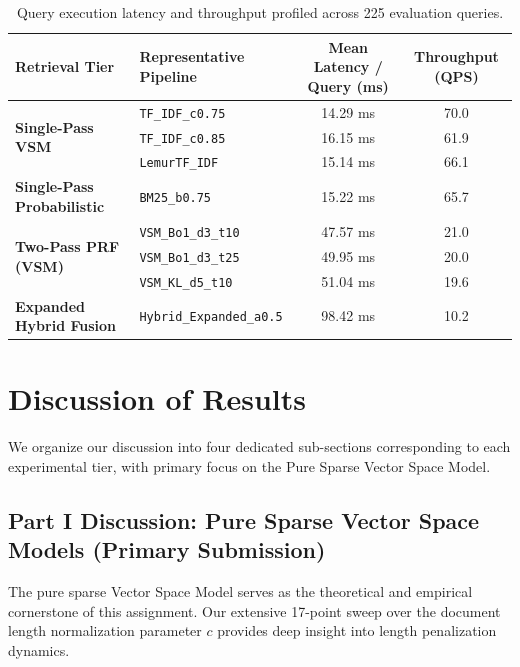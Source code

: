 \documentclass[10pt, a4paper]{article}
\begin{document}
\begin{table}[H]
\centering
\small
\begin{tabular}{@{}llcc@{}}
\toprule
\textbf{Retrieval Tier} & \textbf{Representative Pipeline} & \textbf{Mean Latency / Query (ms)} & \textbf{Throughput (QPS)} \\ \midrule
\multirow{3}{*}{\textbf{Single-Pass VSM}} & \texttt{TF\_IDF\_c0.75} & 14.29 ms & 70.0 \\
& \texttt{TF\_IDF\_c0.85} & 16.15 ms & 61.9 \\
& \texttt{LemurTF\_IDF} & 15.14 ms & 66.1 \\ \midrule
\textbf{Single-Pass Probabilistic} & \texttt{BM25\_b0.75} & 15.22 ms & 65.7 \\ \midrule
\multirow{3}{*}{\textbf{Two-Pass PRF (VSM)}} & \texttt{VSM\_Bo1\_d3\_t10} & 47.57 ms & 21.0 \\
& \texttt{VSM\_Bo1\_d3\_t25} & 49.95 ms & 20.0 \\
& \texttt{VSM\_KL\_d5\_t10} & 51.04 ms & 19.6 \\ \midrule
\textbf{Expanded Hybrid Fusion} & \texttt{Hybrid\_Expanded\_a0.5} & 98.42 ms & 10.2 \\ \bottomrule
\end{tabular}
\caption{Query execution latency and throughput profiled across 225 evaluation queries.}
\label{tab:latency}
\end{table}

\section{Discussion of Results}
\label{sec:discussion}

We organize our discussion into four dedicated sub-sections corresponding to each experimental tier, with primary focus on the Pure Sparse Vector Space Model.

\subsection{Part I Discussion: Pure Sparse Vector Space Models (Primary Submission)}
\label{sec:disc_part1}

The pure sparse Vector Space Model serves as the theoretical and empirical cornerstone of this assignment. Our extensive 17-point sweep over the document length normalization parameter $c$ provides deep insight into length penalization dynamics.
\end{document}
